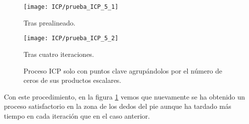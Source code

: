 \begin{figure}[th!]
	
	\begin{minipage}[b]{0.5\textwidth}
		\centering
		\texttt{[image: ICP/prueba\_ICP\_5\_1]} 
		\caption*{Tras prealineado.}
	\end{minipage}
	\begin{minipage}[b]{0.5\textwidth}
		\centering
		\texttt{[image: ICP/prueba\_ICP\_5\_2]}
		\caption*{Tras cuatro iteraciones.}
		
	\end{minipage}
	
	\caption{Proceso ICP solo con puntos clave agrupándolos por el número de ceros de sus productos escalares.}
	\label{fig:ICPej5}
\end{figure}

Con este procedimiento, en la figura \ref{fig:ICPej5} vemos que nuevamente se ha obtenido un proceso satisfactorio en la zona de los dedos del pie aunque ha tardado más tiempo en cada iteración que en el caso anterior.